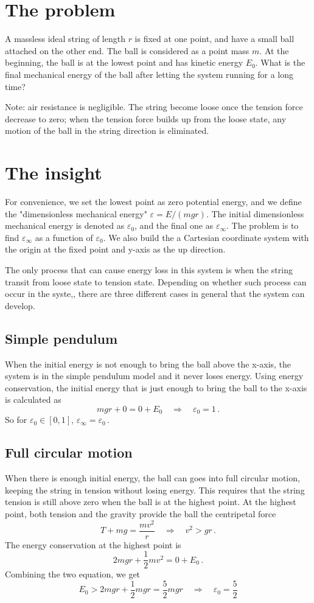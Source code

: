 \documentclass[]{article}
\begin{document}
\section{The problem}

A massless ideal string of length $r$ is fixed at one point, and have a small ball attached on the other end. The ball is considered as a point mass $m$. At the beginning, the ball is at the lowest point and has kinetic energy $E_0$. What is the final mechanical energy of the ball after letting the system running for a long time?

Note: air resistance is negligible. The string become loose once the tension force decrease to zero; when the tension force builds up from the loose state, any motion of the ball in the string direction is eliminated.

\section{The insight}

For convenience, we set the lowest point as zero potential energy, and we define the "dimensionless mechanical energy" $\varepsilon = E/(mgr)$. The initial dimensionless mechanical energy is denoted as $\varepsilon_0$, and the final one as $\varepsilon_\infty$. The problem is to find $\varepsilon_\infty$ as a function of $\varepsilon_0$. We also build the a Cartesian coordinate system with the origin at the fixed point and y-axis as the up direction.

The only process that can cause energy loss in this system is when the string transit from loose state to tension state. Depending on whether such process can occur in the syste,, there are three different cases in general that the system can develop.

\subsection{Simple pendulum}
When the initial energy is not enough to bring the ball above the x-axis, the system is in the simple pendulum model and it never loses energy. Using energy conservation, the initial energy that is just enough to bring the ball to the x-axis is calculated as
\[
mgr + 0 = 0 + E_0 \quad\Rightarrow\quad \varepsilon_0 = 1 \,.
\]
So for $\varepsilon_0 \in [0, 1]$, $\varepsilon_\infty = \varepsilon_0$\,.

\subsection{Full circular motion}
When there is enough initial energy, the ball can goes into full circular motion, keeping the string in tension without losing energy. This requires that the string tension is still above zero when the ball is at the highest point. At the highest point, both tension and the gravity provide the ball the centripetal force
\[
T + mg = \frac{mv^2}{r} \quad\Rightarrow\quad v^2 > gr \, .
\]
The energy conservation at the highest point is
\[
2mgr + \frac{1}{2}mv^2 = 0 + E_0 \, .
\]
Combining the two equation, we get
\[
E_0 > 2mgr +  \frac{1}{2}mgr = \frac{5}{2}mgr \quad\Rightarrow\quad \varepsilon_0 = \frac{5}{2}
\]
\end{document}
